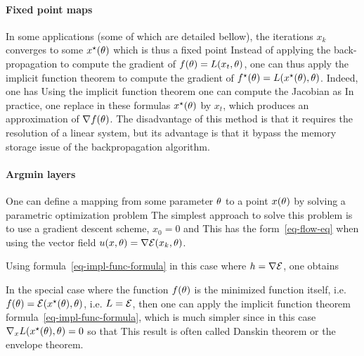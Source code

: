 \paragraph{Fixed point maps}

In some applications (some of which are detailed bellow), the iterations $x_k$ converges to some $x^\star(\theta)$ which is thus a fixed point 
Instead of applying the back-propagation to compute the gradient of $f(\theta) = L(x_t,\theta)$, one can thus apply the implicit function theorem to compute the gradient of $f^\star(\theta) = L(x^\star(\theta),\theta)$. Indeed, one has
Using the implicit function theorem one can compute the Jacobian as
In practice, one replace in these formulas $x^\star(\theta)$ by $x_t$, which produces an approximation of $\nabla f(\theta)$. 
%
The disadvantage of this method is that it requires the resolution of a linear system, but its advantage is that it bypass the memory storage issue of the backpropagation algorithm.



\paragraph{Argmin layers}

One can define a mapping from some parameter $\theta$ to a point $x(\theta)$ by solving a parametric optimization problem
The simplest approach to solve this problem is to use a gradient descent scheme, $x_0=0$ and
This has the form~\eqref{eq-flow-eq} when using the vector field $u(x,\theta) = \nabla \mathcal{E}(x_k,\theta)$. 

Using formula~\eqref{eq-impl-func-formula} in this case where $h=\nabla \mathcal{E}$, one obtains

In the special case where the function $f(\theta)$ is the minimized function itself, i.e. $f(\theta)=\mathcal{E}(x^\star(\theta),\theta)$, i.e. $L=\mathcal{E}$, then one can apply the implicit function theorem formula~\eqref{eq-impl-func-formula}, which is much simpler since in this case $\nabla_x L(x^\star(\theta),\theta)=0$ so that 
This result is often called Danskin theorem or the envelope theorem. 


